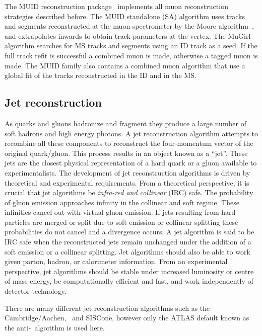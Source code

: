 The MUID reconstruction package~\cite{Detector:ExpectedPerf} implements all muon reconstruction strategies described before. The MUID standalone (SA) algorithm uses tracks and segments reconstructed at the muon spectrometer by the Moore algorithm~\cite{Detector:MooreReconstruction}, and extrapolates inwards to obtain track parameters at the vertex. The MuGirl algorithm searches for MS tracks and segments using an ID track as a seed. If the full track refit is successful a combined muon is made, otherwise a tagged muon is made. The MUID family also contains a combined muon algorithm that use a global fit of the tracks reconstructed in the ID and in the MS.

\subsection{Jet reconstruction} \label{sec:Detector-JetReconstruction}

As quarks and gluons hadronize and fragment they produce a large number of soft hadrons and high energy photons. A jet reconstruction algorithm attempts to recombine all these components to reconstruct the four-momentum vector of the original quark/gluon. This process results in an object known as a ``jet''. These jets are the closest physical representation of a hard quark or a gluon available to experimentalists. The development of jet reconstruction algorithms is driven by theoretical and experimental requirements. From a theoretical perspective, it is crucial that jet algorithms be \emph{infra-red and collinear} (IRC) safe. The probability of gluon emission approaches infinity in the collinear and soft regime. These infinities cancel out with virtual gluon emission. If jets resulting from hard particles are merged or split due to soft emission or collinear splitting these probabilities do not cancel and a divergence occurs. A jet algorithm is said to be IRC safe when the reconstructed jets remain unchanged under the addition of a soft emission or a collinear splitting. Jet algorithms should also be able to work given parton, hadron, or calorimeter information. From an experimental perspective, jet algorithms should be stable under increased luminosity or centre of mass energy, be computationally efficient and fast, and work independently of detector technology. 

There are many different jet reconstruction algorithms such as the Cambridge/Aachen, \kt\ and SISCone, however only the ATLAS default known as the anti-\kt\ algorithm is used here.

